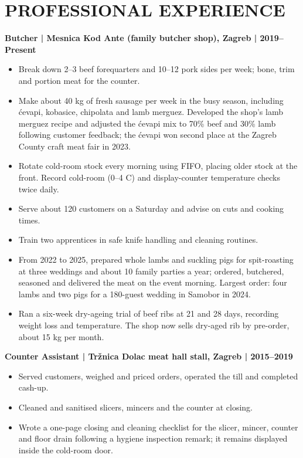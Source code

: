 \documentclass[11pt,a4paper]{article}
\begin{document}
\section*{PROFESSIONAL EXPERIENCE}
\textbf{Butcher | Mesnica Kod Ante (family butcher shop), Zagreb | 2019–Present}
\begin{itemize}
\item Break down 2–3 beef forequarters and 10–12 pork sides per week; bone, trim and portion meat for the counter.
\item Make about 40 kg of fresh sausage per week in the busy season, including ćevapi, kobasice, chipolata and lamb merguez. Developed the shop’s lamb merguez recipe and adjusted the ćevapi mix to 70\% beef and 30\% lamb following customer feedback; the ćevapi won second place at the Zagreb County craft meat fair in 2023.
\item Rotate cold-room stock every morning using FIFO, placing older stock at the front. Record cold-room (0–4 \textdegree C) and display-counter temperature checks twice daily.
\item Serve about 120 customers on a Saturday and advise on cuts and cooking times.
\item Train two apprentices in safe knife handling and cleaning routines.
\item From 2022 to 2025, prepared whole lambs and suckling pigs for spit-roasting at three weddings and about 10 family parties a year; ordered, butchered, seasoned and delivered the meat on the event morning. Largest order: four lambs and two pigs for a 180-guest wedding in Samobor in 2024.
\item Ran a six-week dry-ageing trial of beef ribs at 21 and 28 days, recording weight loss and temperature. The shop now sells dry-aged rib by pre-order, about 15 kg per month.
\end{itemize}

\textbf{Counter Assistant | Tržnica Dolac meat hall stall, Zagreb | 2015–2019}
\begin{itemize}
\item Served customers, weighed and priced orders, operated the till and completed cash-up.
\item Cleaned and sanitised slicers, mincers and the counter at closing.
\item Wrote a one-page closing and cleaning checklist for the slicer, mincer, counter and floor drain following a hygiene inspection remark; it remains displayed inside the cold-room door.
\end{itemize}
\end{document}
